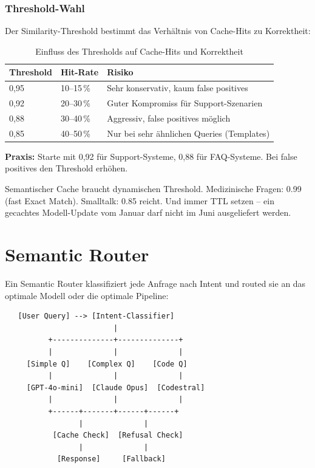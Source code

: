 \subsubsection{Threshold-Wahl}

Der Similarity-Threshold bestimmt das Verhältnis von Cache-Hits zu Korrektheit:

\begin{table}[H]
\centering
\begin{tabularx}{\linewidth}{lXX}
\toprule
\textbf{Threshold} & \textbf{Hit-Rate} & \textbf{Risiko} \\
\midrule
0,95 & 10--15\,\% & Sehr konservativ, kaum false positives \\
0,92 & 20--30\,\% & Guter Kompromiss für Support-Szenarien \\
0,88 & 30--40\,\% & Aggressiv, false positives möglich \\
0,85 & 40--50\,\% & Nur bei sehr ähnlichen Queries (Templates) \\
\bottomrule
\end{tabularx}
\caption{Einfluss des Thresholds auf Cache-Hits und Korrektheit}
\label{tab:threshold}
\end{table}

\textbf{Praxis:} Starte mit 0,92 für Support-Systeme, 0,88 für FAQ-Systeme. Bei false positives den Threshold erhöhen.

\begin{praxishinweis}
Semantischer Cache braucht dynamischen Threshold. Medizinische Fragen: 0.99 (fast Exact Match). Smalltalk: 0.85 reicht. Und immer TTL setzen -- ein gecachtes Modell-Update vom Januar darf nicht im Juni ausgeliefert werden.
\end{praxishinweis}

\section{Semantic Router}

Ein Semantic Router klassifiziert jede Anfrage nach Intent und routed sie an das optimale Modell oder die optimale Pipeline:

\begin{verbatim}
   [User Query] --> [Intent-Classifier]
                         |
          +--------------+--------------+
          |              |              |
     [Simple Q]    [Complex Q]    [Code Q]
          |              |              |
     [GPT-4o-mini]  [Claude Opus]  [Codestral]
          |              |              |
          +------+-------+------+------+
                 |              |
           [Cache Check]  [Refusal Check]
                 |              |
            [Response]     [Fallback]
\end{verbatim}

